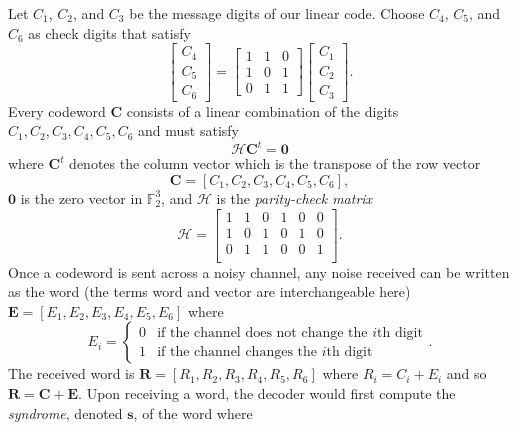 \begin{example}\label{ex:simlin}
    Let $C_1$, $C_2$, and $C_3$ be the message digits of our linear code. Choose $C_4$, $C_5$, and $C_6$ as check digits that satisfy
    \[
        \left[\begin{array}{c}
            C_4\\
            C_5\\
            C_6
        \end{array}\right] = 
        \left[\begin{array}{ccc}
            1 & 1 & 0\\
            1 & 0 & 1\\
            0 & 1 & 1
        \end{array}\right]
        \left[\begin{array}{c}
            C_1\\
            C_2\\
            C_3
        \end{array}\right].
    \]
    Every codeword $\mathbf{C}$ consists of a linear combination of the digits $C_1, C_2, C_3, C_4, C_5, C_6$ and must satisfy
    \[
        \mathscr{H}\textbf{C}^t = \textbf{0}
    \]
    where $\textbf{C}^t$ denotes the column vector which is the transpose of the row vector
    \[
        \textbf{C} = [C_1, C_2, C_3, C_4, C_5, C_6],
    \]
    $\textbf{0}$ is the zero vector in $\mathbb{F}_2^3$, and $\mathscr{H}$ is the \textit{parity-check matrix}
    \[
        \mathscr{H} = 
        \left[\begin{array}{cccccc}
            1 & 1 & 0 & 1 & 0 & 0\\
            1 & 0 & 1 & 0 & 1 & 0\\
            0 & 1 & 1 & 0 & 0 & 1\\
        \end{array}\right].
    \]
    Once a codeword is sent across a noisy channel, any noise received can be written as the word (the terms word and vector are interchangeable here) $\textbf{E} = [E_1, E_2, E_3, E_4, E_5, E_6]$ where
    \[
        E_i = \begin{cases}
            0 & \text{if the channel does not change the $i$th digit}\\
            1 & \text{if the channel changes the $i$th digit}
        \end{cases}.
    \]
    The received word is $\textbf{R} = [R_1, R_2, R_3, R_4, R_5, R_6]$ where $R_i = C_i + E_i$ and so $\textbf{R} = \textbf{C} + \textbf{E}$. Upon receiving a word, the decoder would first compute the \textit{syndrome}, denoted $\textbf{s}$, of the word where

\end{example}
